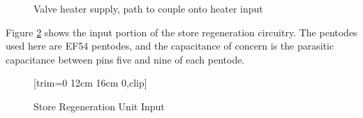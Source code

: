 \begin{figure}[ht]
	\centering
	\caption{Valve heater supply, path to couple onto heater input}
	\label{fig:store-regen-input-sch}
\end{figure}

Figure \ref{fig:store-regen-input} shows the input portion of the store regeneration circuitry. The pentodes used here are EF54 pentodes, and the capacitance of concern is the parasitic capacitance between pins five and nine of each pentode.

\begin{figure}[ht]
	\centering
	[trim={0 12cm 16cm 0},clip] %
	\caption{Store Regeneration Unit Input \cite{burton2014b}}
	\label{fig:store-regen-input}
\end{figure}

